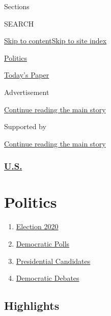 Sections

SEARCH

\protect\hyperlink{site-content}{Skip to
content}\protect\hyperlink{site-index}{Skip to site index}

\href{https://www.nytimes.com/section/politics}{Politics}

\href{https://myaccount.nytimes.com/auth/login?response_type=cookie\&client_id=vi}{}

\href{https://www.nytimes.com/section/todayspaper}{Today's Paper}

Advertisement

\protect\hyperlink{after-top}{Continue reading the main story}

Supported by

\protect\hyperlink{after-sponsor}{Continue reading the main story}

\hypertarget{us}{%
\subsubsection{\texorpdfstring{\href{/section/us}{U.S.}}{U.S.}}\label{us}}

\hypertarget{politics}{%
\section{Politics}\label{politics}}

\begin{enumerate}
\def\labelenumi{\arabic{enumi}.}
\tightlist
\item
  \href{https://www.nytimes.com/news-event/2020-election}{Election 2020}
\item
  \href{https://www.nytimes.com/interactive/2020/us/elections/democratic-polls.html}{Democratic
  Polls}
\item
  \href{https://www.nytimes.com/interactive/2019/us/politics/2020-presidential-candidates.html}{Presidential
  Candidates}
\item
  \href{https://www.nytimes.com/news-event/democratic-debates}{Democratic
  Debates}
\end{enumerate}

\hypertarget{highlights}{%
\subsection{Highlights}\label{highlights}}

